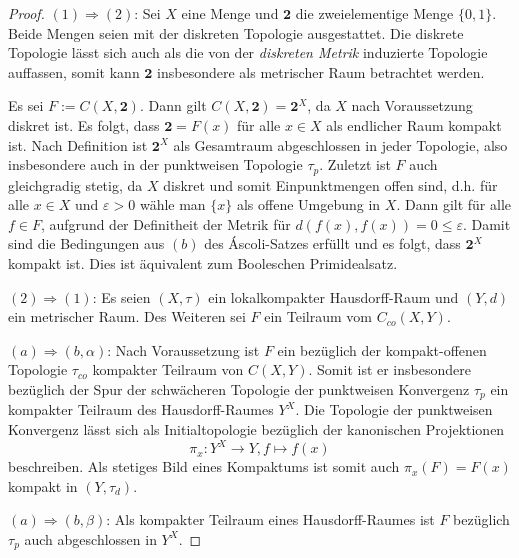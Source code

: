\begin{proof}
  $(1) \Rightarrow (2)$: Sei $X$ eine Menge und $\mathbf{2}$ die zweielementige Menge $\{0,1\}$. Beide Mengen seien  mit der diskreten Topologie ausgestattet. 
  Die diskrete Topologie lässt sich auch als die von der \textit{diskreten Metrik} induzierte Topologie auffassen, somit kann $\mathbf{2}$ insbesondere als metrischer Raum betrachtet werden. 

  Es sei $F := C(X, \mathbf{2})$.
  Dann gilt $C(X, \mathbf{2}) = \mathbf{2}^X$, da $X$ nach Voraussetzung diskret ist.
  Es folgt, dass $\mathbf{2} = F(x)$ für alle $x \in X$ als endlicher Raum kompakt ist.
  Nach Definition ist $\mathbf{2}^X$ als Gesamtraum abgeschlossen in jeder Topologie, also insbesondere auch in der punktweisen Topologie $\tau_p$.
  Zuletzt ist $F$ auch gleichgradig stetig, da $X$ diskret und somit Einpunktmengen offen sind, d.h. für alle $x \in X$ und $\varepsilon > 0$ wähle man $\{x\}$ als offene Umgebung in $X$. 
  Dann gilt für alle $f \in F$, aufgrund der Definitheit der Metrik für  $d(f(x),f(x)) = 0 \leq \varepsilon$.
  Damit sind die Bedingungen aus $(b)$ des Áscoli-Satzes erfüllt und es folgt, dass $\mathbf{2}^X$ kompakt ist. 
  Dies ist äquivalent zum Booleschen Primidealsatz.

  $(2) \Rightarrow (1)$: Es seien $(X,\tau)$ ein lokalkompakter Hausdorff-Raum und $(Y,d)$ ein metrischer Raum.
  Des Weiteren sei $F$ ein Teilraum vom $C_{co}(X,Y)$.

  $(a) \Rightarrow (b, \alpha)$: 
  Nach Voraussetzung ist $F$ ein bezüglich der kompakt-offenen Topologie $\tau_{co}$ kompakter Teilraum von $C(X,Y)$.
  Somit ist er insbesondere bezüglich der Spur der schwächeren Topologie der punktweisen Konvergenz $\tau_p$ ein kompakter Teilraum des Hausdorff-Raumes $Y^X$.
  Die Topologie der punktweisen Konvergenz lässt sich als Initialtopologie bezüglich der kanonischen Projektionen 
  \begin{displaymath}
    \pi_x : Y^X \to Y, f \mapsto f(x)
  \end{displaymath}
  beschreiben.
  Als stetiges Bild eines Kompaktums ist somit auch $\pi_x(F) = F(x)$ kompakt in $(Y,\tau_d)$.

  $(a) \Rightarrow (b, \beta)$:  
  Als kompakter Teilraum eines Hausdorff-Raumes ist $F$ bezüglich $\tau_p$ auch abgeschlossen in $Y^X$.


\end{proof}
